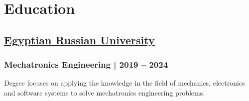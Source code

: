 \section*{Education}
%
%
%
\subsection*{
  \href{https://www.eru.edu.eg/}{Egyptian Russian University}
}
\subsubsection*{Mechatronics Engineering | 2019 -- 2024}
Degree focuses on applying the knowledge in the field of mechanics, electronics and software systems to solve mechatronics engineering problems.